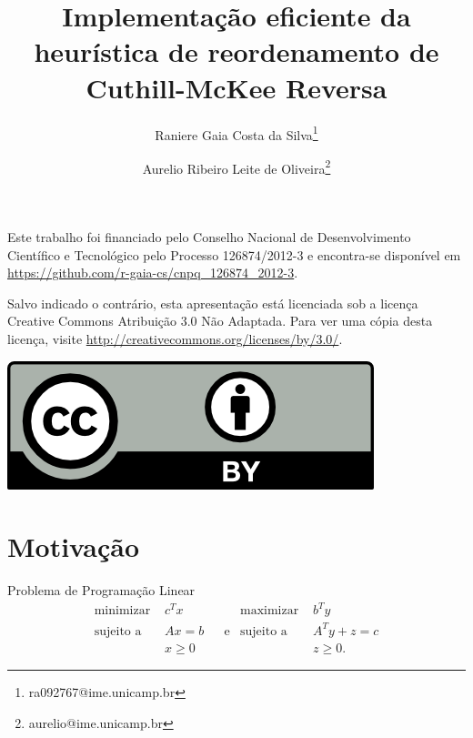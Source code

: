 \documentclass[10pt]{beamer}
\begin{document}
\title[Cuthill-McKee Reversa]{Implementa\c{c}\~{a}o eficiente da heur\'{i}stica de reordenamento de Cuthill-McKee Reversa}
\author[Raniere Silva]{Raniere Gaia Costa da
Silva\footnote{ra092767@ime.unicamp.br}
\and Aurelio Ribeiro Leite de Oliveira\footnote{aurelio@ime.unicamp.br}}
\date{}
\begin{frame}
  \maketitle

  \footnotesize{Este trabalho foi financiado pelo Conselho Nacional de
  Desenvolvimento Cient\'{i}fico e Tecnol\'{o}gico pelo Processo 126874/2012-3 e
  encontra-se disponível em
  \url{https://github.com/r-gaia-cs/cnpq_126874_2012-3}.}

  \footnotesize{Salvo indicado o contrário, esta apresentação está licenciada sob a licença
  Creative Commons Atribuição 3.0 Não Adaptada. Para ver uma cópia desta
  licença, visite \url{http://creativecommons.org/licenses/by/3.0/}.}
  \begin{center}
    \includegraphics[scale=.5]{figures/cc-by.png}
  \end{center}
\end{frame}

\begin{frame}
  \tableofcontents
\end{frame}

\section{Motivação}
\begin{frame}{Problema de Programação Linear}
  \begin{align*}
      \text{minimizar } & c^T x
      &&& \text{maximizar } & b^T y \\
      \text{sujeito a } & A x = b
      &&\text{e}& \text{sujeito a } & A^T y + z = c \\
      & x \geq 0
      &&& & z \geq 0.
  \end{align*}
\end{frame}
\end{document}
